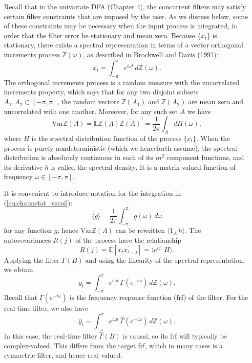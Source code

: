 \documentclass[a4paper]{book}
\def\ZZ{\mathbb Z}
\def\EE{\mathbb E}
\begin{document}
 Recall that in the univariate DFA (Chapter 4), the concurrent filters may satisfy certain filter constraints
 that are imposed by the user.  As we discuss below, some of these constraints may be necessary
when the input process is integrated, in order that the filter error be stationary and mean zero.
 Because $\{ x_t \}$ is stationary, there exists a spectral representation in terms of a vector orthogonal increments
process $\ZZ (\omega)$, as described in Brockwell and Davis (1991):
\[
  x_t = \int_{-\pi}^{\pi} e^{i \omega t} \, d\ZZ (\omega).
\]
  The orthogonal increments process is a random measure with the uncorrelated increments property, 
 which says that for any two disjoint subsets $A_1, A_2 \subset [-\pi, \pi]$, the random vectors
$\ZZ (A_1)$ and $\ZZ (A_2)$ are mean zero and uncorrelated with one another.  Moreover, for any such set $A$
we have
\begin{equation}
 \label{eq:chapnstat_varoi}
  \mbox{Var} \ZZ (A) = \EE \ZZ(A) \overline{\ZZ (A)}^{\prime} = \frac{1}{2 \pi} \int_{A} dH(\omega),
\end{equation}
 where $H$ is the spectral distribution function of the process $\{ x_t \}$.  When the process is purely nondeterministic (which 
we henceforth assume), the spectral distribution is absolutely continuous in each of its $m^2$ component functions, and its derivative 
$h$ is called the spectral density.  It is a matrix-valued function of frequency $\omega \in [-\pi, \pi]$.

It is convenient to introduce notation for the integration in (\ref{eq:chapnstat_varoi}):
\[
 \langle g \rangle =  \frac{1}{2 \pi} \int_{-\pi}^{\pi} g(\omega) \, d\omega
\]
 for any function $g$; hence $\mbox{Var} \ZZ (A)$ can be rewritten $\langle 1_A \, h \rangle$.  The autocovariances $R (j)$ of 
the process have the relationship
\[
  R(j) = \EE [ x_t x_{t-j}^{\prime} ] = \langle e^{i j\cdot } H \rangle.
\]
  Applying the filter $\Gamma (B)$ and using the linearity of the spectral representation, we obtain
\[
  y_t = \int_{-\pi}^{\pi} e^{i \omega t} \, \Gamma (e^{-i \omega}) \, d\ZZ (\omega).
\]
  Recall that $\Gamma (e^{-i \omega})$ is the frequency response function (frf) of the filter.  For the real-time filter, we also have
\[
  \widehat{y}_t = \int_{-\pi}^{\pi} e^{i \omega t} \, \widehat{\Gamma} (e^{-i \omega}) \, d\ZZ (\omega).
\]
 In this case, the real-time filter $\widehat{\Gamma} (B)$ is causal, so its frf will typically be complex-valued.  This differs from the target frf,
 which in many cases is a symmetric filter, and hence real-valued.
\end{document}
